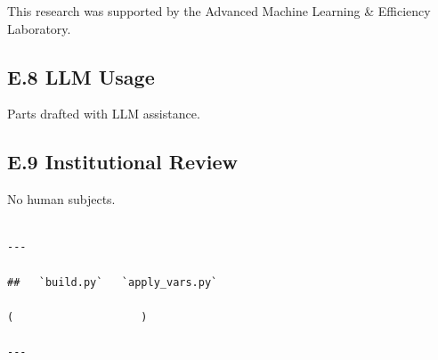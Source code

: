 This research was supported by the Advanced Machine Learning \& Efficiency Laboratory.

\subsection{E.8 LLM Usage}

Parts drafted with LLM assistance.

\subsection{E.9 Institutional Review}

No human subjects.
\begin{lstlisting}

---

##   `build.py`   `apply_vars.py`

(                    )

---
\end{lstlisting}